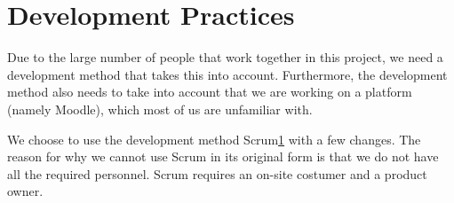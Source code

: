 \section{Development Practices}

Due to the large number of people that work together in this project, we need a development method that takes this into account.
Furthermore, the development method also needs to take into account that we are working on a platform (namely Moodle), which most of us are unfamiliar with.

We choose to use the development method Scrum\ref{} with a few changes.
The reason for why we cannot use Scrum in its original form is that we do not have all the required personnel. 
Scrum requires an on-site costumer and a product owner.












